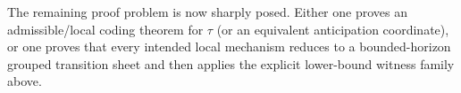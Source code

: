 \begin{remark}
The remaining proof problem is now sharply posed. Either one proves an admissible/local coding theorem for $\tau$ (or an equivalent anticipation coordinate), or one proves that every intended local mechanism reduces to a bounded-horizon grouped transition sheet and then applies the explicit lower-bound witness family above.
\end{remark}
